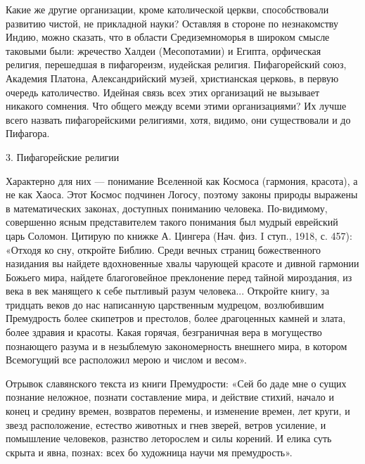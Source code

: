 Какие же другие организации, кроме католической церкви, способствовали
развитию  чистой,   не  прикладной   науки?  Оставляя  в   стороне  по
незнакомству  Индию,  можно  сказать, что  в  области  Средиземноморья
в  широком  смысле таковыми  были:  жречество  Халдеи (Месопотамии)  и
Египта,  орфическая  религия,   перешедшая  в  пифагореизм,  иудейская
религия. Пифагорейский союз,  Академия Платона, Александрийский музей,
христианская  церковь, в  первую очередь  католичество. Идейная  связь
всех этих организаций не вызывает  никакого сомнения. Что общего между
всеми  этими  организациями?  Их лучше  всего  назвать  пифагорейскими
религиями, хотя, видимо, они существовали и до Пифагора.

3. Пифагорейские религии

Характерно  для них  ---  понимание Вселенной  как Космоса  (гармония,
красота),  а  не  как  Хаоса. Этот  Космос  подчинен  Логосу,  поэтому
законы природы выражены в  математических законах, доступных пониманию
человека.   По-видимому,   совершенно  ясным   представителем   такого
понимания  был мудрый  еврейский царь  Соломон. Цитирую  по книжке  А.
Цингера (Нач.  физ. I ступ., 1918,  с. 457): «Отходя ко  сну, откройте
Библию.  Среди  вечных  страниц  божественного  назидания  вы  найдете
вдохновенные хвалы  чарующей красоте  и дивной гармонии  Божьего мира,
найдете благоговейное  преклонение перед тайной мироздания,  из века в
век  манящего к  себе пытливый  разум человека...  Откройте книгу,  за
тридцать  веков до  нас написанную  царственным мудрецом,  возлюбившим
Премудрость более  скипетров и  престолов, более драгоценных  камней и
злата, более  здравия и  красоты. Какая  горячая, безграничная  вера в
могущество познающего  разума и  в незыблемую  закономерность внешнего
мира, в котором Всемогущий все расположил мерою и числом и весом».

Отрывок славянского  текста из книги  Премудрости: «Сей бо даде  мне о
сущих познание неложное, познати  составление мира, и действие стихий,
начало  и конец  и  средину времен,  возвратов  перемены, и  изменение
времен,  лет круги,  и звезд  расположение, естество  животных и  гнев
зверей, ветров усиление, и помышление человеков, разнство леторослем и
силы корений.  И елика суть скрыта  и явна, познах: всех  бо художница
научи мя премудрость».

